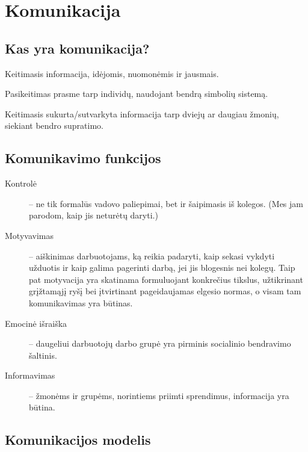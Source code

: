 \chapter{Komunikacija}

\section{Kas yra komunikacija?}

\begin{defn}[Komunikacija]
  Keitimasis informacija, idėjomis, nuomonėmis ir jausmais.
\end{defn}

\begin{defn}[Komunikacija]
  Pasikeitimas prasme tarp individų, naudojant bendrą simbolių sistemą.
\end{defn}

\begin{defn}[Komunikacija]
  Keitimasis sukurta/sutvarkyta informacija tarp dviejų ar daugiau
  žmonių, siekiant bendro supratimo.
\end{defn}

\section{Komunikavimo funkcijos}

\begin{description}
  \item[Kontrolė] – ne tik formalūs vadovo paliepimai, bet ir
    šaipimasis iš kolegos. (Mes jam parodom, kaip jis neturėtų daryti.)
  \item[Motyvavimas] – aiškinimas darbuotojams, ką reikia padaryti,
    kaip sekasi vykdyti užduotis ir kaip galima pagerinti darbą,
    jei jis blogesnis nei kolegų. Taip pat motyvacija yra skatinama
    formuluojant konkrečius tikslus, užtikrinant grįžtamąjį ryšį
    bei įtvirtinant pageidaujamas elgesio normas, o visam
    tam komunikavimas yra būtinas.
  \item[Emocinė išraiška] – daugeliui darbuotojų darbo grupė yra
    pirminis socialinio bendravimo šaltinis.
  \item[Informavimas] – žmonėms ir grupėms, norintiems priimti
    sprendimus, informacija yra būtina.
\end{description}

\section{Komunikacijos modelis}

